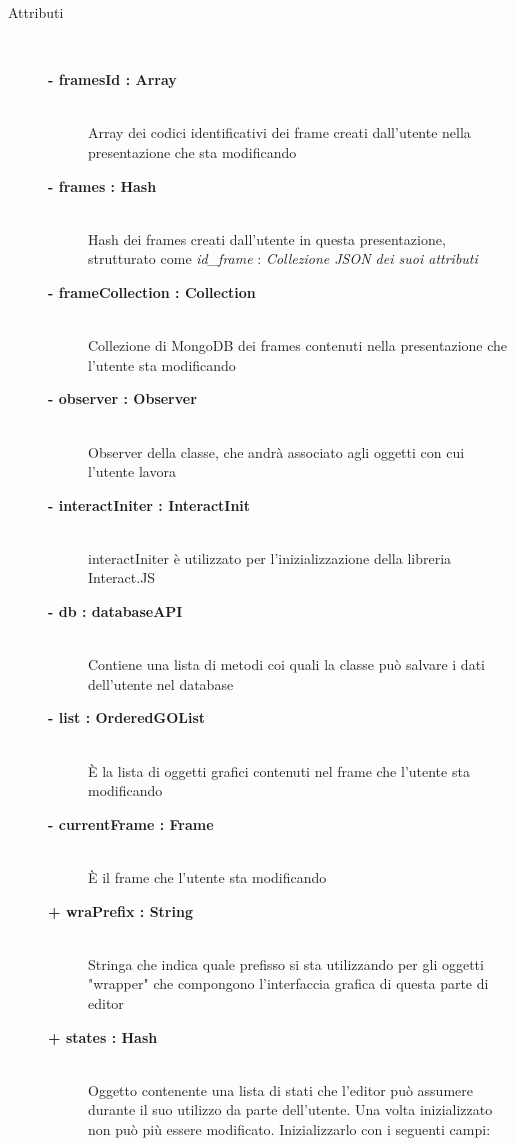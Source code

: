 \begin{description}
	
\item[Attributi] \hfill \\
	\begin{description}
		\item[\textbf{- framesId : Array			}] \hfill \\
			Array dei codici identificativi dei frame creati dall'utente nella presentazione che sta modificando
		\item[\textbf{- frames : Hash			}] \hfill \\
			Hash dei frames creati dall'utente in questa presentazione, strutturato come \textit{id\_frame} : \textit{Collezione JSON dei suoi attributi}
		\item[\textbf{- frameCollection : Collection			}] \hfill \\
			Collezione di MongoDB dei frames contenuti nella presentazione che l'utente sta modificando
		\item[\textbf{- observer : Observer			}] \hfill \\
			Observer della classe, che andrà associato agli oggetti con cui l'utente lavora
		\item[\textbf{- interactIniter : InteractInit			}] \hfill \\
			interactIniter è utilizzato per l'inizializzazione della libreria Interact.JS
		\item[\textbf{- db : databaseAPI			}] \hfill \\
			Contiene una lista di metodi coi quali la classe può salvare i dati dell'utente nel database
		\item[\textbf{- list : OrderedGOList			}] \hfill \\
			È la lista di oggetti grafici contenuti nel frame che l'utente sta modificando
		\item[\textbf{- currentFrame : Frame			}] \hfill \\
			È il frame che l'utente sta modificando
		\item[\textbf{+ wraPrefix : String			}] \hfill \\
			Stringa che indica quale prefisso si sta utilizzando per gli oggetti "wrapper" che compongono l'interfaccia grafica di questa parte di editor
		\item[\textbf{+ states : Hash			}] \hfill \\
			Oggetto contenente una lista di stati che l'editor può assumere durante il suo utilizzo da parte dell'utente. Una volta inizializzato non può più essere modificato. Inizializzarlo con i seguenti campi:

\end{description}
\end{description}
